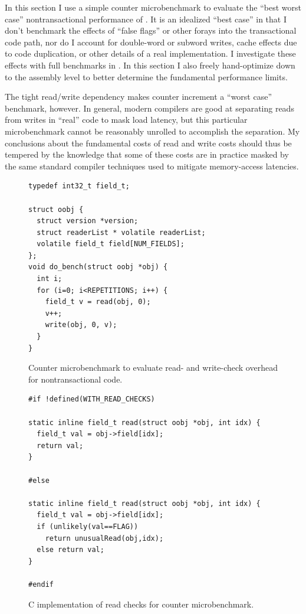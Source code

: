 In this section I use a simple counter microbenchmark to evaluate the
``best worst case'' nontransactional performance of \apex.
It is an idealized ``best case'' in that I don't benchmark
the effects of ``false flags'' or other forays into the transactional
code path, nor do I account for double-word or subword writes,
cache effects due to code duplication, or other details of a real
implementation.  I investigate these effects with full
benchmarks in .  In this section I also freely
hand-optimize down to the assembly level to better determine the fundamental
performance limits.  

The tight read/write dependency makes counter increment
a ``worst case'' benchmark, however.  In general,
modern compilers are good at separating reads from writes in
``real'' code to mask load latency, but this particular microbenchmark
cannot be reasonably unrolled to accomplish the separation.  My
conclusions about the fundamental costs of read and write costs should
thus be tempered by the knowledge that some of these costs are in
practice masked by the same standard compiler techniques used to
mitigate memory-access latencies.

\begin{figure}
\sis\fontsize{9}{10}\begin{verbatim}
typedef int32_t field_t;

struct oobj {
  struct version *version;
  struct readerList * volatile readerList;
  volatile field_t field[NUM_FIELDS];
};
void do_bench(struct oobj *obj) {
  int i;
  for (i=0; i<REPETITIONS; i++) {
    field_t v = read(obj, 0);
    v++;
    write(obj, 0, v);
  }
}
\end{verbatim}
\caption{Counter microbenchmark to evaluate read- and write-check
  overhead for nontransactional code.}
\label{fig:counter-bench}
\end{figure}

\begin{figure}
\sis\fontsize{9}{10}\begin{verbatim}
#if !defined(WITH_READ_CHECKS)

static inline field_t read(struct oobj *obj, int idx) {
  field_t val = obj->field[idx];
  return val;
}

#else

static inline field_t read(struct oobj *obj, int idx) {
  field_t val = obj->field[idx];
  if (unlikely(val==FLAG))
    return unusualRead(obj,idx);
  else return val;
}

#endif
\end{verbatim}
\caption{C implementation of read checks for counter microbenchmark.}
\label{fig:counter-read}
\end{figure}

